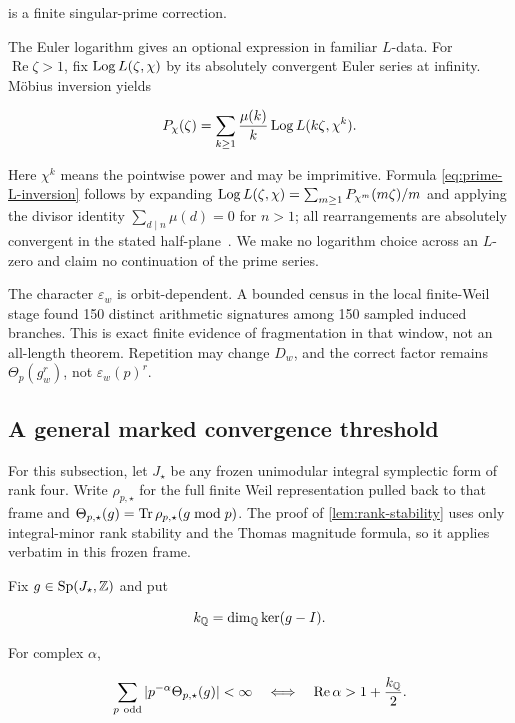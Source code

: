 is a finite singular-prime correction.

The Euler logarithm gives an optional expression in familiar \(L\)-data.
For \(\operatorname{Re}\zeta>1\), fix \(\operatorname{Log} L(\zeta,\chi)\) by its
absolutely convergent Euler series at infinity.  M\"obius inversion yields

\begin{equation}
 P_\chi(\zeta)
 =\sum_{k\ge1}\frac{\mu(k)}{k}
   \operatorname{Log} L(k\zeta,\chi^k).
 \label{eq:prime-L-inversion}
\end{equation}

Here \(\chi^k\) means the pointwise power and may be imprimitive.  Formula
\eqref{eq:prime-L-inversion} follows by expanding
\(\operatorname{Log} L(\zeta,\chi)=\sum_{m\ge1}P_{\chi^m}(m\zeta)/m\) and applying the
divisor identity \(\sum_{d\mid n}\mu(d)=0\) for \(n>1\); all rearrangements
are absolutely convergent in the stated half-plane~\citep{apostol1976}.  We
make no logarithm choice across an \(L\)-zero and claim no continuation of
the prime series.

The character \(\varepsilon_w\) is orbit-dependent.  A bounded census in the local
finite-Weil stage found 150 distinct arithmetic signatures among 150 sampled
induced branches.  This is exact finite evidence of fragmentation in that
window, not an all-length theorem.  Repetition may change \(D_w\), and the
correct factor remains \(\Theta_p(g_w^r)\), not \(\varepsilon_w(p)^r\).

\subsection{A general marked convergence threshold}

For this subsection, let \(J_\star\) be any frozen unimodular integral
symplectic form of rank four.  Write \(\rho_{p,\star}\) for the full finite
Weil representation pulled back to that frame and
\(\Theta_{p,\star}(g)=\operatorname{Tr}\rho_{p,\star}(g\bmod p)\).  The proof of
\cref{lem:rank-stability} uses only integral-minor rank stability and the
Thomas magnitude formula, so it applies verbatim in this frozen frame.

\begin{proposition}
\label{prop:marked-threshold}
Fix \(g\in\operatorname{Sp}(J_\star,\mathbb Z)\) and put

\[
 k_\mathbb Q=\dim_\mathbb Q\ker(g-I).
\]

For complex \(\alpha\),

\begin{equation}
 \sum_{p\ \odd}|p^{-\alpha}\Theta_{p,\star}(g)|<\infty
 \quad\Longleftrightarrow\quad
 \operatorname{Re}\alpha>1+\frac{k_\Q}{2}.
 \label{eq:marked-threshold}
\end{equation}
\end{proposition}

